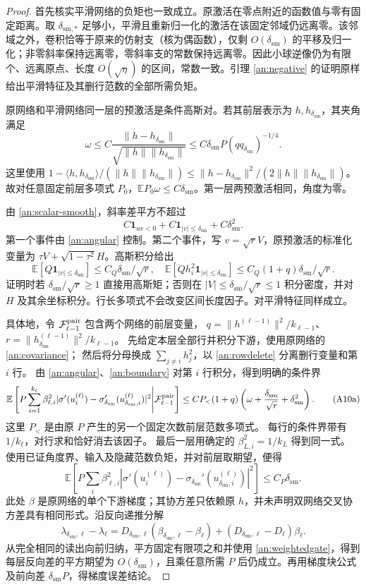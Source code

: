 \documentclass[a4paper]{tufte-handout}
\newcommand{\dsm}{\delta_{\mathrm{sm}}}
\begin{document}
\begin{fullwidth}
\begin{proof}
首先核实平滑网络的负矩也一致成立。原激活在零点附近的函数值与零有固定距离。取 $\delta_{\mathrm{sm},*}$ 足够小，平滑且重新归一化的激活在该固定邻域仍远离零。该邻域之外，卷积恰等于原来的仿射支（核为偶函数），仅剩 $O(\dsm)$ 的平移及归一化；非零斜率保持远离零，零斜率支的常数保持远离零。因此小球逆像仍为有限个、远离原点、长度 $O(\sqrt\eta)$ 的区间，常数一致。引理 \ref{an:negative} 的证明原样给出平滑特征及其删行范数的全部所需负矩。

原网络和平滑网络同一层的预激活是条件高斯对。若其前层表示为 $h,h_{\dsm}$，其夹角满足
\[
 \omega\le C\frac{\|h-h_{\dsm}\|}{\sqrt{\|h\|\|h_{\dsm}\|}}
 \le C\dsm P(q q_{\dsm})^{-1/4}.
\]
这里使用 $1-\langle h,h_{\dsm}\rangle/(\|h\|\|h_{\dsm}\|)
\le\|h-h_{\dsm}\|^2/(2\|h\|\|h_{\dsm}\|)$。故对任意固定前层多项式 $P_0$，$\mathbb E P_0\omega\le C\dsm$。第一层两预激活相同，角度为零。

由 \eqref{an:scalar-smooth}，斜率差平方不超过
\[
 C\boldsymbol1_{uv<0}+C\boldsymbol1_{|v|\le\dsm}+C\dsm^2.
\]
第一个事件由 \eqref{an:angular} 控制。第二个事件，写 $v=\sqrt rV$，原预激活的标准化变量为 $\tau V+\sqrt{1-\tau^2}H$。高斯积分给出
\[
 \mathbb E[Q\boldsymbol1_{|v|\le\dsm}]\le C_Q\dsm/\sqrt r,
 \quad
 \mathbb E[Qh_i^2\boldsymbol1_{|v|\le\dsm}]\le C_Q(1+q)\dsm/\sqrt r. \tag{A10}\label{an:boundary}
\]
证明时若 $\dsm/\sqrt r\ge1$ 直接用高斯矩；否则在 $|V|\le\dsm/\sqrt r\le1$ 积分密度，并对 $H$ 及其余坐标积分。行长多项式不会改变区间长度因子。对平滑特征同样成立。

具体地，令 $\mathcal F_{\ell-1}^{\rm pair}$ 包含两个网络的前层变量，
$q=\|h^{(\ell-1)}\|^2/k_{\ell-1}$、$r=\|h_{\dsm}^{(\ell-1)}\|^2/k_{\ell-1}$。
先给定本层全部行并积分下游，使用原网络的 \eqref{an:covariance}；
然后将分母换成 $\sum_{j\ne i}h_j^2$，以 \eqref{an:rowdelete} 分离删行变量和第 $i$ 行。
由 \eqref{an:angular}、\eqref{an:boundary} 对第 $i$ 行积分，得到明确的条件界
\[
 \mathbb E\left[P\sum_{i=1}^{k_\ell}\beta_{\ell,i}^2
 |\sigma'(u_i^{(\ell)})-\sigma_{\dsm}'(u_{\dsm,i}^{(\ell)})|^2
 \middle|\mathcal F_{\ell-1}^{\rm pair}\right]
 \le C P_{<}(1+q)\left(\omega+\frac{\dsm}{\sqrt r}+\dsm^2\right).
 \tag{A10a}\label{an:conditionalgate}
\]
这里 $P_{<}$ 是由原 $P$ 产生的另一个固定次数前层范数多项式。
每行的条件界带有 $1/k_\ell$，对行求和恰好消去该因子。
最后一层用确定的 $\beta_{L,i}^2=1/k_L$ 得到同一式。
使用已证角度界、输入及隐藏范数负矩，并对前层取期望，便得
\[
 \mathbb E\left[P\sum_i\beta_{\ell,i}^2
 |\sigma'(u_i^{(\ell)})-\sigma_{\dsm}'(u_{\dsm,i}^{(\ell)})|^2\right]
 \le C_P\dsm. \tag{A11}\label{an:weightedgate}
\]
此处 $\beta$ 是原网络的单个下游梯度；其协方差只依赖原 $h$，并未声明双网络交叉协方差具有相同形式。沿反向递推分解
\[
 \lambda_{\dsm,\ell}-\lambda_\ell
 =D_{\dsm,\ell}(\beta_{\dsm,\ell}-\beta_\ell)
   +(D_{\dsm,\ell}-D_\ell)\beta_\ell.
\]
从完全相同的读出向前归纳，平方固定有限项之和并使用 \eqref{an:weightedgate}，得到每层反向差的平方期望为 $O(\dsm)$，且乘任意所需 $P$ 后仍成立。再用梯度块公式及前向差 $\dsm P$，得梯度误差结论。


\end{proof}
\end{fullwidth}
\end{document}
